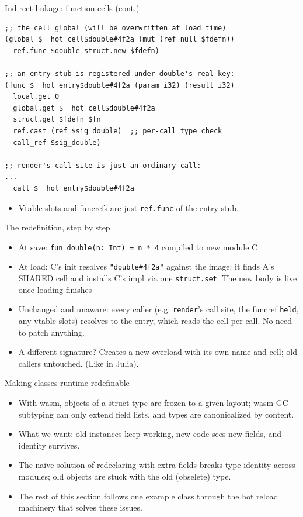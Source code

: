\documentclass[10pt,presentation]{beamer}
\begin{document}
\begin{frame}[label={sec:org5d75e77},fragile]{Indirect linkage: function cells (cont.)}
 \begin{verbatim}
;; the cell global (will be overwritten at load time)
(global $__hot_cell$double#4f2a (mut (ref null $fdefn))
  ref.func $double struct.new $fdefn)

;; an entry stub is registered under double's real key:
(func $__hot_entry$double#4f2a (param i32) (result i32)
  local.get 0
  global.get $__hot_cell$double#4f2a
  struct.get $fdefn $fn
  ref.cast (ref $sig_double)  ;; per-call type check
  call_ref $sig_double)

;; render's call site is just an ordinary call:
...
  call $__hot_entry$double#4f2a
\end{verbatim}

\begin{itemize}
\item Vtable slots and funcrefs are just \texttt{ref.func} of the entry stub.
\end{itemize}
\end{frame}
\begin{frame}[label={sec:org04ff952},fragile]{The redefinition, step by step}
 \begin{itemize}
\item \alert{At save}: \texttt{fun double(n: Int) = n * 4} compiled to new module C
\item \alert{At load}: C's init resolves \texttt{"double\#4f2a"} against the image: it
finds A's SHARED cell and installs C's impl via one \texttt{struct.set}.
The new body is live once loading finishes
\item \alert{Unchanged and unaware}: every caller (e.g. \texttt{render}'s call site,
the funcref \texttt{held}, any vtable slots) resolves to the entry, which
reads the cell per call. No need to patch anything.
\item \alert{A different signature?} Creates a new overload with its own name
and cell; old callers untouched. (Like in Julia).
\end{itemize}
\end{frame}
\begin{frame}[label={sec:orgccc879c}]{Making classes runtime redefinable}
\begin{itemize}
\item With wasm, objects of a struct type are frozen to a given layout;
wasm GC subtyping can only \alert{extend} field lists, and types are
canonicalized by content.
\item What we want: old instances keep working, new code sees new fields,
and identity survives.
\item The naive solution of redeclaring with extra fields breaks type
identity across modules; old objects are stuck with the old
(obselete) type.
\item The rest of this section follows one example class through the hot
reload machinery that solves these issues.
\end{itemize}
\end{frame}
\end{document}
